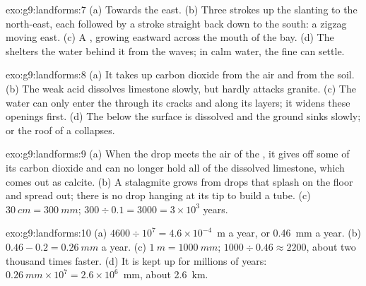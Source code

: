 \begin{solution}{exo:g9:landforms:7}
(a) Towards the east. (b) Three strokes up the  slanting to the
north-east, each followed by a stroke straight back down to the south: a
zigzag moving east. (c) A , growing eastward across the mouth of the
bay. (d) The  shelters the water behind it from the waves; in calm
water, the fine  can settle.
\end{solution}

\begin{solution}{exo:g9:landforms:8}
(a) It takes up carbon dioxide from the air and from the soil. (b) The
weak acid dissolves limestone slowly, but hardly attacks granite. (c) The
water can only enter the  through its cracks and along its layers; it
widens these openings first. (d) The  below the surface is dissolved
and the ground sinks slowly; or the roof of a  collapses.
\end{solution}

\begin{solution}{exo:g9:landforms:9}
(a) When the drop meets the air of the , it gives off some of its
carbon dioxide and can no longer hold all of the dissolved limestone, which
comes out as calcite. (b) A stalagmite grows from drops that splash on the
floor and spread out; there is no drop hanging at its tip to build a tube.
(c) $\qty{30}{cm} = \qty{300}{mm}$; $300 \div 0.1 = 3000 = 3 \times 10^3$
years.
\end{solution}

\begin{solution}{exo:g9:landforms:10}
(a) $4600 \div 10^7 = 4.6 \times 10^{-4}$~m a year, or \qty{0.46}{mm} a
year. (b) $0.46 - 0.2 = \qty{0.26}{mm}$ a year. (c) $\qty{1}{m} =
\qty{1000}{mm}$; $1000 \div 0.46 \approx 2200$, about two thousand times
faster. (d) It is kept up for millions of years: $\qty{0.26}{mm} \times
10^7 = 2.6 \times 10^6$~mm, about \qty{2.6}{km}.
\end{solution}

